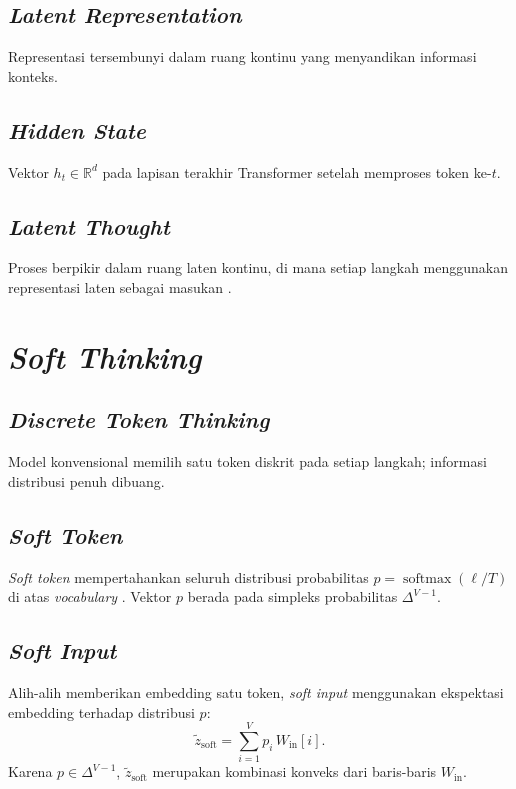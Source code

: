 \subsection{\textit{Latent Representation}}
Representasi tersembunyi dalam ruang kontinu yang menyandikan informasi konteks.

\subsection{\textit{Hidden State}}
Vektor \(h_t \in \mathbb{R}^d\) pada lapisan terakhir Transformer setelah memproses token ke-\(t\).

\subsection{\textit{Latent Thought}}
Proses berpikir dalam ruang laten kontinu, di mana setiap langkah menggunakan representasi laten sebagai masukan \citep{coconut}.

\section{\textit{Soft Thinking}}

\subsection{\textit{Discrete Token Thinking}}
Model konvensional memilih satu token diskrit pada setiap langkah; informasi distribusi penuh dibuang.

\subsection{\textit{Soft Token}}
\textit{Soft token} mempertahankan seluruh distribusi probabilitas \(p = \operatorname{softmax}(\ell/T)\) di atas \textit{vocabulary} \citep{softthinking}. Vektor \(p\) berada pada simpleks probabilitas \(\Delta^{V-1}\).

\subsection{\textit{Soft Input}}
Alih-alih memberikan embedding satu token, \textit{soft input} menggunakan ekspektasi embedding terhadap distribusi \(p\):
\begin{equation}
\tilde z_{\mathrm{soft}} = \sum_{i=1}^V p_i \, W_{\mathrm{in}}[i].
\end{equation}
Karena \(p \in \Delta^{V-1}\), \(\tilde z_{\mathrm{soft}}\) merupakan kombinasi konveks dari baris-baris \(W_{\mathrm{in}}\).

